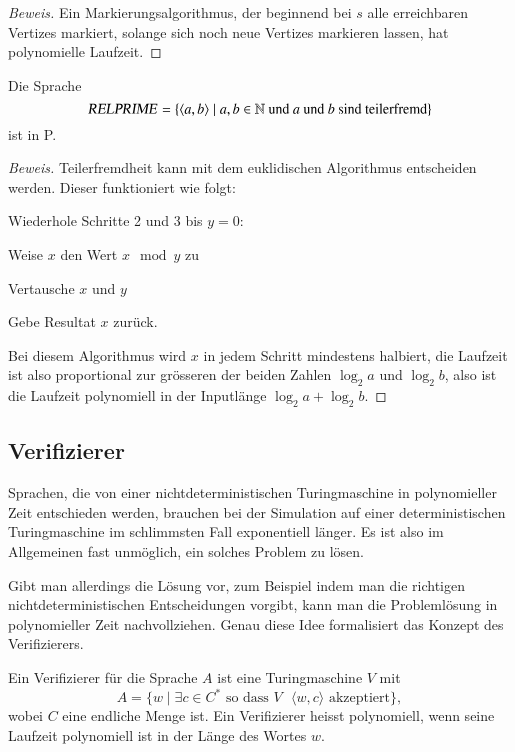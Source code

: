 \begin{proof}[Beweis]
Ein Markierungsalgorithmus, der beginnend bei $s$ alle erreichbaren
Vertizes markiert, solange sich noch neue Vertizes markieren lassen,
hat polynomielle Laufzeit.
\end{proof}

\begin{satz}
Die Sprache
\[
\text{\textsl{RELPRIME}}
=\{
\langle a,b\rangle \;|\;
\text{$a, b\in \mathbb N$ und $a$ und $b$ sind teilerfremd}
\}
\]
ist in P.
\end{satz}

\begin{proof}[Beweis]
Teilerfremdheit kann mit dem euklidischen Algorithmus entscheiden werden.
Dieser funktioniert wie folgt:
\begin{compactenum}
\item Wiederhole Schritte 2 und 3 bis $y=0$:
\item Weise $x$ den Wert $x\mod y$ zu
\item Vertausche $x$ und $y$
\item Gebe Resultat $x$ zurück.
\end{compactenum}
Bei diesem Algorithmus wird $x$ in jedem Schritt mindestens halbiert,
die Laufzeit ist also proportional zur grösseren der
beiden Zahlen $\log_2 a$ und $\log_2 b$, also ist die Laufzeit
polynomiell in der Inputlänge $\log_2 a+\log_2 b$.
\end{proof}

\subsection{Verifizierer}
Sprachen, die von einer nichtdeterministischen Turingmaschine
in polynomieller Zeit entschieden werden, brauchen bei der
Simulation auf einer deterministischen Turingmaschine im
schlimmsten Fall exponentiell länger. Es ist also im
Allgemeinen fast unmöglich, ein solches Problem zu lösen.

Gibt man allerdings die Lösung vor, zum Beispiel indem man
die richtigen nichtdeterministischen Entscheidungen vorgibt,
kann man die Problemlösung in polynomieller Zeit nachvollziehen.
Genau diese Idee formalisiert das Konzept des Verifizierers.

\begin{definition}
Ein Verifizierer für die Sprache $A$ ist eine Turingmaschine
$V$ mit
\[
A=\{
w\;|\;\text{$\exists c\in C^*$ so dass $V$ $\langle w,c\rangle$ akzeptiert}
\},
\]
wobei $C$ eine endliche Menge ist.
Ein Verifizierer heisst polynomiell, wenn seine Laufzeit polynomiell
ist in der Länge des Wortes $w$.
\end{definition}

